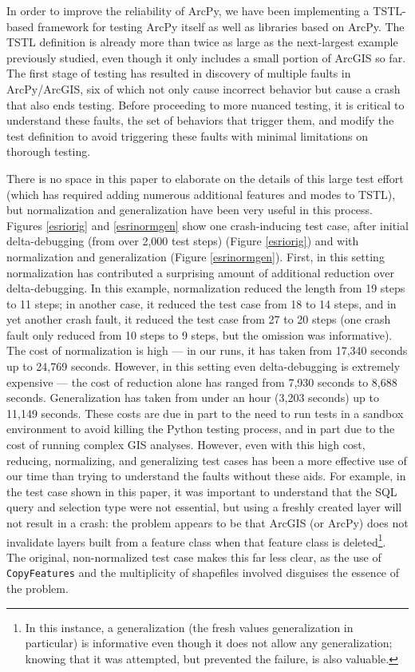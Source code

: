 In order to improve the reliability of ArcPy, we have been
implementing a TSTL-based framework for testing ArcPy itself as well
as libraries based on ArcPy.  The TSTL definition is already more than
twice as large as the next-largest example previously studied, even
though it only includes a small portion of ArcGIS so far. The first
stage of testing has resulted in discovery of multiple faults in
ArcPy/ArcGIS, six of which not only cause incorrect behavior but
cause a crash that also ends testing.  Before proceeding to more
nuanced testing, it is critical to understand these faults, the set of
behaviors that trigger them, and modify the test definition to avoid
triggering these faults with minimal limitations on thorough testing.

There is no space in this paper to elaborate on the details of this
large test effort (which has required adding numerous additional
features and modes to TSTL), but normalization and generalization have
been very useful in this process.  Figures \ref{esriorig} and
\ref{esrinormgen} show one crash-inducing test case, after initial
delta-debugging (from over 2,000 test steps) (Figure \ref{esriorig})
and with normalization and generalization (Figure \ref{esrinormgen}).
First, in this setting normalization has contributed a surprising
amount of additional reduction over delta-debugging.  In this example,
normalization reduced the length from 19 steps to 11 steps; in another
case, it reduced the test case from 18 to 14 steps, and in yet another
crash fault, it reduced the test case from 27 to 20 steps (one crash
fault only reduced from 10 steps to 9 steps, but the omission was
informative).  The cost of normalization is high --- in our runs, it
has taken from 17,340 seconds up to 24,769 seconds.  However, in this
setting even delta-debugging is extremely expensive --- the cost of
reduction alone has ranged from 7,930 seconds to 8,688 seconds.
Generalization has taken from under an hour (3,203 seconds) up to
11,149 seconds.  These costs are due in part to the need to run tests
in a sandbox environment to avoid killing the Python testing process,
and in part due to the cost of running complex GIS analyses.  However,
even with this high cost, reducing, normalizing, and generalizing test
cases has been a more effective use of our time than trying to
understand the faults without these aids.  For example, in the test
case shown in this paper, it was important to understand that the SQL
query and selection type were not essential, but using a freshly
created layer will not result in a crash: the problem appears to be
that ArcGIS (or ArcPy) does not invalidate layers built from a feature
class when that feature class is deleted\footnote{In this instance, a
  generalization (the fresh values generalization in particular) is
  informative even though it does not allow any generalization;
  knowing that it was attempted, but prevented the failure, is also
  valuable.}.  The original, non-normalized test case makes this far
less clear, as the use of {\tt CopyFeatures} and the multiplicity of
shapefiles involved disguises the essence of the problem.

